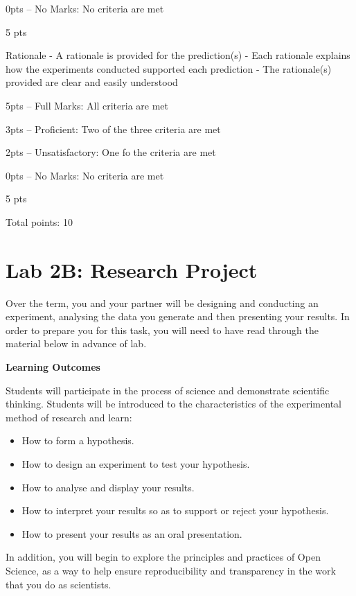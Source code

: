 \documentclass[
]{book}
\providecommand{\tightlist}{%
  \setlength{\itemsep}{0pt}\setlength{\parskip}{0pt}}
\begin{document}
0pts -- No Marks: No criteria are met

5 pts

Rationale
- A rationale is provided for the prediction(s)
- Each rationale explains how the experiments conducted supported each prediction
- The rationale(s) provided are clear and easily understood

5pts -- Full Marks: All criteria are met

3pts -- Proficient: Two of the three criteria are met

2pts -- Unsatisfactory: One fo the criteria are met

0pts -- No Marks: No criteria are met

5 pts

Total points: 10

\hypertarget{lab-2b-research-project}{%
\chapter*{Lab 2B: Research Project}\label{lab-2b-research-project}}

Over the term, you and your partner will be designing and conducting an experiment, analysing the data you generate and then presenting your results. In order to prepare you for this task, you will need to have read through the material below in advance of lab.

\textbf{Learning Outcomes}

Students will participate in the process of science and demonstrate scientific thinking. Students will be introduced to the characteristics of the experimental method of research and learn:

\begin{itemize}
\tightlist
\item
  How to form a hypothesis.
\item
  How to design an experiment to test your hypothesis.
\item
  How to analyse and display your results.
\item
  How to interpret your results so as to support or reject your hypothesis.
\item
  How to present your results as an oral presentation.
\end{itemize}

In addition, you will begin to explore the principles and practices of Open Science, as a way to help ensure reproducibility and transparency in the work that you do as scientists.
\end{document}
